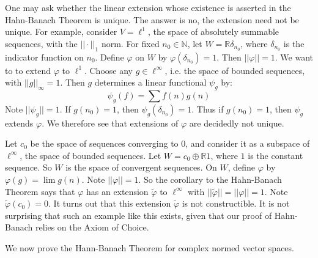 \documentclass[a4paper,12pt]{report}
\newcommand{\vphi} {\varphi}
\newenvironment{example}[1][Example.]{\begin{trivlist}
\item[\hskip \labelsep {\bfseries #1}]}{\end{trivlist}}
\begin{document}
	\begin{example}
	One may ask whether the linear extension whose existence is asserted in the Hahn-Banach Theorem is unique. The answer is no, the extension need not be unique. For example, consider $V = \ell^1$, the space of absolutely summable sequences, with the $||\cdot||_1$ norm. For fixed $n_0 \in \mathbb{N}$, let $W = \mathbb{R} \delta_{n_0}$, where $\delta_{n_0}$ is the indicator function on $n_0$. Define $\vphi$ on $W$ by $\vphi(\delta_{n_0}) = 1$. Then $||\vphi|| = 1$. We want to to extend $\vphi$ to $\ell^1$. Choose any $g \in \ell^\infty$, i.e. the space of bounded sequences, with $||g||_\infty = 1$. Then $g$ determines a linear functional $\psi_g$ by:
	\[ \psi_g(f) = \sum f(n) g(n) \]
	Note $||\psi_g|| = 1$. If $g(n_0) = 1$, then $\psi_g(\delta_{n_0}) = 1$. Thus if $g(n_0) = 1$, then $\psi_g$ extends $\vphi$. We therefore see that extensions of $\vphi$ are decidedly not unique.
	\end{example}
	
	\begin{example}
	Let $c_0$ be the space of sequences converging to $0$, and consider it as a subspace of $\ell^\infty$, the space of bounded sequences. Let $W = c_0 \oplus \mathbb{R}1$, where $1$ is the constant sequence. So $W$ is the space of convergent sequences. On $W$, define $\vphi$ by $\vphi(g) = \lim g(n)$. Note $||\vphi|| = 1$. So the corollary to the Hahn-Banach Theorem says that $\vphi$ has an extension $\tilde{\vphi}$ to $\ell^\infty$ with $||\tilde{\vphi}|| = ||\vphi|| = 1$. Note $\tilde{\vphi}(c_0) = 0$. It turns out that this extension $\tilde{\vphi}$ is not constructible. It is not surprising that such an example like this exists, given that our proof of Hahn-Banach relies on the Axiom of Choice. 
	\end{example}
	
	\noindent We now prove the Hann-Banach Theorem for complex normed vector spaces.
	
\end{document}
